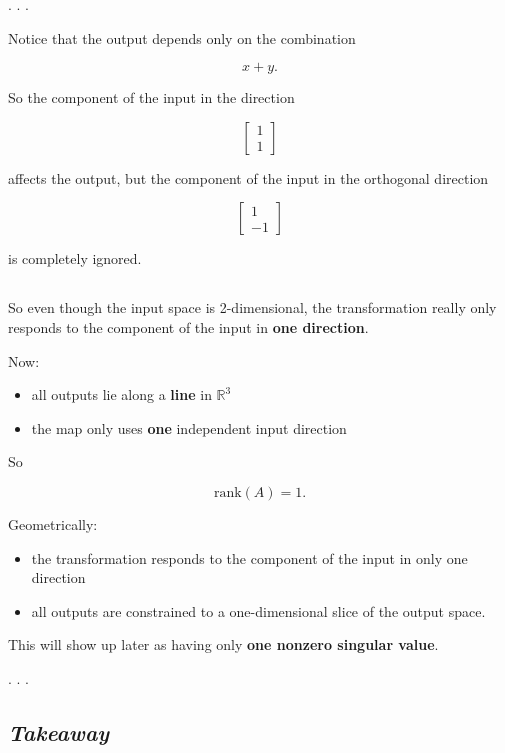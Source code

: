 \documentclass[
  letterpaper,
  DIV=11,
  numbers=noendperiod]{scrartcl}
\providecommand{\tightlist}{%
  \setlength{\itemsep}{0pt}\setlength{\parskip}{0pt}}\usepackage{longtable,booktabs,array}
\begin{document}
. . .

Notice that the output depends only on the combination

\[
x+y.
\]

So the component of the input in the direction

\[
\begin{bmatrix}1\\1\end{bmatrix}
\]

affects the output, but the component of the input in the orthogonal
direction

\[
\begin{bmatrix}1\\-1\end{bmatrix}
\]

is completely ignored.

\subsection{\texorpdfstring{\emph{}}{}}\label{section}

So even though the input space is 2-dimensional, the transformation
really only responds to the component of the input in \textbf{one
direction}.

Now:

\begin{itemize}
\tightlist
\item
  all outputs lie along a \textbf{line} in \(\mathbb{R}^3\)
\item
  the map only uses \textbf{one} independent input direction
\end{itemize}

So

\[
\mathrm{rank}(A) = 1.
\]

Geometrically:

\begin{itemize}
\tightlist
\item
  the transformation responds to the component of the input in only one
  direction
\item
  all outputs are constrained to a one-dimensional slice of the output
  space.
\end{itemize}

This will show up later as having only \textbf{one nonzero singular
value}.

. . .

\subsection{\texorpdfstring{\emph{Takeaway}}{Takeaway}}\label{takeaway}
\end{document}
